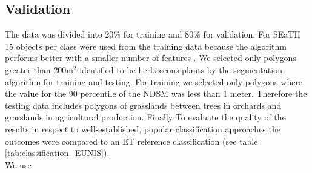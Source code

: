 \documentclass[authoryear, review,12pt,number]{elsarticle}
\begin{document}
\subsection{Validation} 
The data was divided into 20\% for training and 80\% for validation. For SEaTH 
15 objects per class were used from the training data because the algorithm 
performs better with a smaller number of features \citep{Nussbaum2006}. We 
selected only polygons greater than 200m$^{2}$ identified to be herbaceous 
plants by the segmentation algorithm for training and testing. For training we 
selected only polygons where the value for the 90 percentile of the NDSM was 
less than 1 meter. Therefore the testing data includes polygons of grasslands 
between trees in orchards and grasslands in agricultural production. Finally To 
evaluate the quality of the results in respect to well-established, popular 
classification approaches the outcomes were compared to an ET reference 
classification (see table \ref{tab:classification_EUNIS}).
\\
We use 
\end{document}
